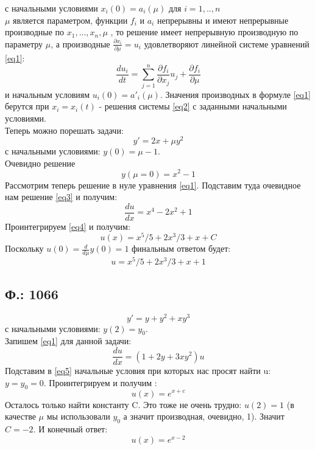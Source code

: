 \documentclass{article}
\begin{document}
с начальными условиями $x_i(0)=a_i(\mu)$ для $i=1,..,n$ \\
$\mu$ является параметром, функции $f_i$ и $a_i$ непрерывны и имеют непрерывные производные по $x_1, ... , x_n, \mu$ , то решение имеет непрерывную производную по параметру $\mu$, а производные $\frac{\partial x_i}{\partial \mu} = u_i$ удовлетворяют линейной системе уравнений \ref{eq1}:
\begin{equation}
\label{eq1}
    \frac{d u_i}{d t} = \sum_{j=1}^n \frac{\partial f_i}{\partial x_j} u_j + \frac{\partial f_i}{\partial \mu}
\end{equation}
и начальным условиям $u_i(0)=a'_i(\mu)$. Значения производных в формуле \ref{eq1} берутся при $x_i=x_i(t)$ - решения системы \ref{eq2} с заданными начальными условиями.\\

Теперь можно порешать задачи:
\begin{equation}
    y'=2x+\mu y^2
\end{equation}
с начальными условиями: $y(0)=\mu-1$. \\
Очевидно решение 
\begin{equation} \label{eq3}
    y(\mu=0)=x^2-1
\end{equation} 
Рассмотрим теперь решение в нуле уравнения \ref{eq1}. Подставим туда очевидное нам решение \ref{eq3} и получим:
\begin{equation} \label{eq4}
    \frac{d u}{d x} = x^4 - 2x^2 +1
\end{equation}
Проинтегрируем \ref{eq4} и получим:
\begin{equation}
    u(x)=x^5/5+2 x^3 /3 + x + C
\end{equation}
Поскольку $u(0)=\frac{d }{d \mu} y(0)=1$ финальным ответом будет:\\
\begin{equation}
    u=x^5/5+2 x^3 /3 + x + 1
\end{equation}
\subsection{Ф.: 1066}
\begin{equation}
    y'= y + y^2 +x y^3
\end{equation}
с начальными условиями: $y(2)=y_0$. \\
Запишем \ref{eq1} для данной задачи:
\begin{equation} \label{eq5}
    \frac{d u}{d x}=(1+2 y + 3x y^2)u
\end{equation}
Подставим в \ref{eq5} начальные условия при которых нас просят найти u: $y=y_0=0$. Проинтегрируем и получим :
\begin{equation}
    u(x)=e^{x+c}
\end{equation}
Осталось только найти константу C. Это тоже не очень трудно: $u(2)=1$ (в качестве $\mu$ мы использовали $y_0$ а значит производная, очевидно, 1). Значит $C = -2$. И конечный ответ:
\begin{equation}
u(x)=e^{x-2}
\end{equation}
\end{document}
